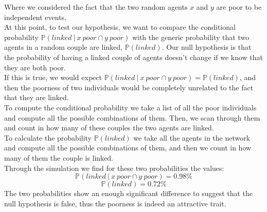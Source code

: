 Where we considered the fact that the two random agents $x$ and $y$ are poor to be independent events. \\
At this point, to test our hypothesis, we want to compare the conditional probability $\mathbb{P}(linked \ \vert \ x \ poor \cap y \ poor)$ with the generic probability that two agents in a random couple are linked, $\mathbb{P}(linked)$.
Our null hypothesis is that the probability of having a linked couple of agents doesn't change if we know that they are both poor. \\
If this is true, we would expect $\mathbb{P}(linked \ \vert \ x \ poor \cap y \ poor) = \mathbb{P}(linked)$, and then the poorness of two individuals would be completely unrelated to the fact that they are linked. \\
To compute the conditional probability we take a list of all the poor individuals and compute all the possible combinations of them.
Then, we scan through them and count in how many of these couples the two agents are linked. \\
To calculate the probability $\mathbb{P}(linked)$ we take all the agents in the network and compute all the possible combinations of them, and then we count in how many of them the couple is linked. \\
Through the simulation we find for these two probabilities the values:
\begin{equation*}
	\mathbb{P}(linked \ \vert \ x \ poor \cap y \ poor) = 0.98\%
\end{equation*}
\begin{equation*}
	\mathbb{P}(linked) = 0.72\%
\end{equation*}
The two probabilities show an enough significant difference to suggest that the null hypothesis is false, thus the poorness is indeed an attractive trait.
